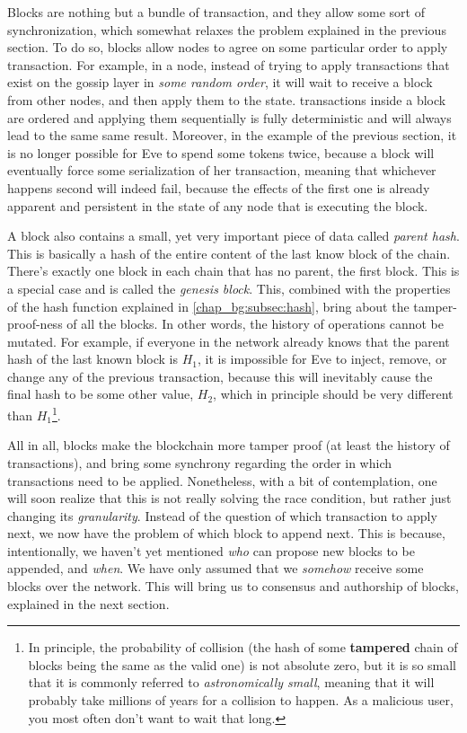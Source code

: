 Blocks are nothing but a bundle of transaction, and they allow some sort of synchronization, which
somewhat relaxes the problem explained in the previous section. To do so, blocks allow nodes to
agree on some particular order to apply transaction. For example, in a node, instead of trying to
apply transactions that exist on the gossip layer in \textit{some random order}, it will wait to
receive a block from other nodes, and then apply them to the state. transactions inside a block are
ordered and applying them sequentially is fully deterministic and will always lead to the same same
result. Moreover, in the example of the previous section, it is no longer possible for Eve to spend
some tokens twice, because a block will eventually force some serialization of her transaction,
meaning that whichever happens second will indeed fail, because the effects of the first one is
already apparent and persistent in the state of any node that is executing the block.

A block also contains a small, yet very important piece of data called \textit{parent hash}. This is
basically a hash of the entire content of the last know block of the chain. There's exactly one
block in each chain that has no parent, the first block. This is a special case and is called the
\textit{genesis block}. This, combined with the properties of the hash function explained in
\ref{chap_bg:subsec:hash}, bring about the tamper-proof-ness of all the blocks. In other words, the
history of operations cannot be mutated. For example, if everyone in the network already knows that
the parent hash of the last known block is $H_1$, it is impossible for Eve to inject, remove, or
change any of the previous transaction, because this will inevitably cause the final hash to be some
other value, $H_2$, which in principle should be very different than $H_1$\footnote{In principle,
the probability of collision (the hash of some \textbf{tampered} chain of blocks being the same as
the valid one) is not absolute zero, but it is so small that it is commonly referred to
\textit{astronomically small}, meaning that it will probably take millions of years for a collision
to happen. As a malicious user, you most often don't want to wait that long.}.

All in all, blocks make the blockchain more tamper proof (at least the history of transactions), and
bring some synchrony regarding the order in which transactions need to be applied. Nonetheless, with
a bit of contemplation, one will soon realize that this is not really solving the race condition,
but rather just changing its \textit{granularity}. Instead of the question of which transaction to
apply next, we now have the problem of which block to append next. This is because, intentionally,
we haven't yet mentioned \textit{who} can propose new blocks to be appended, and \textit{when}. We
have only assumed that we \textit{somehow} receive some blocks over the network. This will bring us
to consensus and authorship of blocks, explained in the next section.


